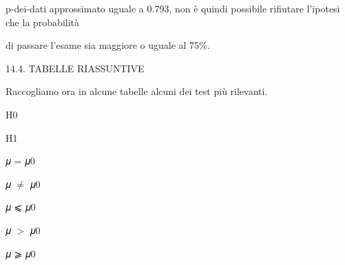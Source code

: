 \documentclass[a4paper,portrait,12pt]{article}
\begin{document}
\begin{flushleft}
p-dei-dati approssimato uguale a 0.793, non \`{e} quindi possibile rifiutare l'ipotesi che la probabilit\`{a}
\end{flushleft}


\begin{flushleft}
di passare l'esame sia maggiore o uguale al 75\%.
\end{flushleft}





\begin{flushleft}
14.4. TABELLE RIASSUNTIVE
\end{flushleft}


\begin{flushleft}
Raccogliamo ora in alcune tabelle alcuni dei test più rilevanti.
\end{flushleft}


\begin{flushleft}
H0
\end{flushleft}





\begin{flushleft}
H1
\end{flushleft}





\begin{flushleft}
𝜇 = 𝜇0
\end{flushleft}





\begin{flushleft}
𝜇 $\neq$ 𝜇0
\end{flushleft}





\begin{flushleft}
𝜇 ⩽ 𝜇0
\end{flushleft}





\begin{flushleft}
𝜇 $>$ 𝜇0
\end{flushleft}





\begin{flushleft}
𝜇 ⩾ 𝜇0
\end{flushleft}
\end{document}
